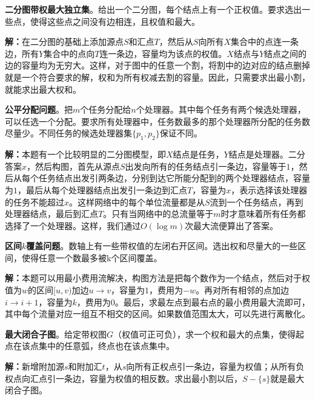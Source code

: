 \documentclass[twoside]{article}
\begin{document}
\indent

\textbf{二分图带权最大独立集}。给出一个二分图，每个结点上有一个正权值。要求选出一些点，使得这些点之间没有边相连，且权值和最大。

\indent

\textbf{解：}在二分图的基础上添加源点$S$和汇点$T$，然后从$S$向所有$X$集合中的点连一条边，所有$Y$集合中的点向$T$连一条边，容量均为该点的权值。$X$结点与$Y$结点之间的边的容量均为无穷大。这样，对于图中的任意一个割，将割中的边对应的结点删掉就是一个符合要求的解，权和为所有权减去割的容量。因此，只需要求出最小割，就能求出最大权和。

\indent

\textbf{公平分配问题}。把$m$个任务分配给$n$个处理器。其中每个任务有两个候选处理器，可以任选一个分配。要求所有处理器中，任务数最多的那个处理器所分配的任务数尽量少。不同任务的候选处理器集$\lbrace p_1 , p_2 \rbrace$保证不同。

\indent

\textbf{解：}本题有一个比较明显的二分图模型，即$X$结点是任务，$Y$结点是处理器。二分答案$x$，然后构图，首先从源点$S$出发向所有的任务结点引一条边，容量等于$1$，然后从每个任务结点出发引两条边，分别到达它所能分配到的两个处理器结点，容量为$1$，最后从每个处理器结点出发引一条边到汇点$T$，容量为$x$，表示选择该处理器的任务不能超过$x$。这样网络中的每个单位流量都是从$S$流到一个任务结点，再到处理器结点，最后到汇点$T$。只有当网络中的总流量等于$m$时才意味着所有任务都选择了一个处理器。这样，我们通过$O(\log m)$次最大流便算出了答案。

\indent

\textbf{区间$k$覆盖问题}。数轴上有一些带权值的左闭右开区间。选出权和尽量大的一些区间，使得任意一个数最多被k个区间覆盖。

\indent

\textbf{解：}本题可以用最小费用流解决，构图方法是把每个数作为一个结点，然后对于权值为$w$的区间$[u,v)$加边$u→v$，容量为$1$，费用为$-w$。再对所有相邻的点加边$i→i+1$，容量为$k$，费用为$0$。最后，求最左点到最右点的最小费用最大流即可，其中每个流量对应一组互不相交的区间。如果数值范围太大，可以先进行离散化。

\indent

\textbf{最大闭合子图}。给定带权图$G$（权值可正可负），求一个权和最大的点集，使得起点在该点集中的任意弧，终点也在该点集中。

\indent

\textbf{解：}新增附加源$s$和附加汇$t$，从$s$向所有正权点引一条边，容量为权值；从所有负权点向汇点引一条边，容量为权值的相反数。求出最小割以后，$S - \lbrace s \rbrace$就是最大闭合子图。
\end{document}
